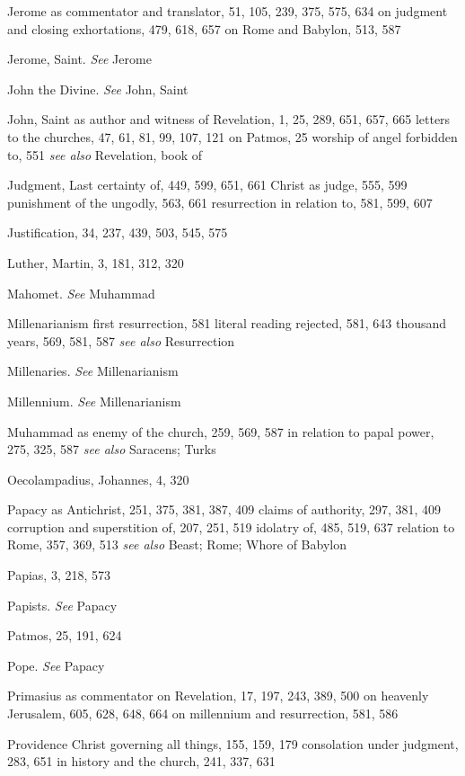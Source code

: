 \begin{theindex}
\item Jerome
\subitem as commentator and translator, 51, 105, 239, 375, 575, 634
\subitem on judgment and closing exhortations, 479, 618, 657
\subitem on Rome and Babylon, 513, 587
\item Jerome, Saint. \emph{See} Jerome
\item John the Divine. \emph{See} John, Saint
\item John, Saint
\subitem as author and witness of Revelation, 1, 25, 289, 651, 657, 665
\subitem letters to the churches, 47, 61, 81, 99, 107, 121
\subitem on Patmos, 25
\subitem worship of angel forbidden to, 551
\subitem \emph{see also} Revelation, book of
\item Judgment, Last
\subitem certainty of, 449, 599, 651, 661
\subitem Christ as judge, 555, 599
\subitem punishment of the ungodly, 563, 661
\subitem resurrection in relation to, 581, 599, 607
\item Justification, 34, 237, 439, 503, 545, 575

\indexspace

\item Luther, Martin, 3, 181, 312, 320

\indexspace

\item Mahomet. \emph{See} Muhammad
\item Millenarianism
\subitem first resurrection, 581
\subitem literal reading rejected, 581, 643
\subitem thousand years, 569, 581, 587
\subitem \emph{see also} Resurrection
\item Millenaries. \emph{See} Millenarianism
\item Millennium. \emph{See} Millenarianism
\item Muhammad
\subitem as enemy of the church, 259, 569, 587
\subitem in relation to papal power, 275, 325, 587
\subitem \emph{see also} Saracens; Turks

\indexspace

\item Oecolampadius, Johannes, 4, 320
\item Papacy
\subitem as Antichrist, 251, 375, 381, 387, 409
\subitem claims of authority, 297, 381, 409
\subitem corruption and superstition of, 207, 251, 519
\subitem idolatry of, 485, 519, 637
\subitem relation to Rome, 357, 369, 513
\subitem \emph{see also} Beast; Rome; Whore of Babylon
\item Papias, 3, 218, 573
\item Papists. \emph{See} Papacy
\item Patmos, 25, 191, 624
\item Pope. \emph{See} Papacy
\item Primasius
\subitem as commentator on Revelation, 17, 197, 243, 389, 500
\subitem on heavenly Jerusalem, 605, 628, 648, 664
\subitem on millennium and resurrection, 581, 586
\item Providence
\subitem Christ governing all things, 155, 159, 179
\subitem consolation under judgment, 283, 651
\subitem in history and the church, 241, 337, 631


\end{theindex}
